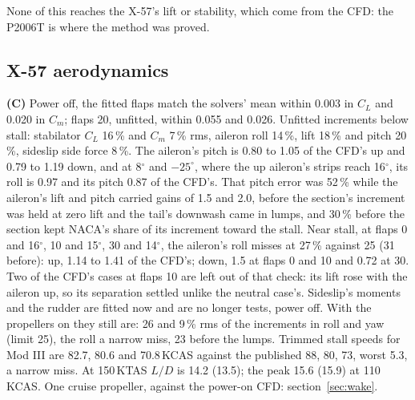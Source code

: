 \documentclass[10pt,a4paper,twocolumn]{article}
\begin{document}
None of this reaches the X-57's lift or stability, which come from the CFD: the P2006T is where the method was proved.

\subsection{X-57 aerodynamics}
\textbf{(C)} Power off, the fitted flaps match the solvers' mean within 0.003 in $C_L$ and 0.020 in $C_m$; flaps 20, unfitted, within 0.055 and 0.026. Unfitted increments below stall: stabilator $C_L$ 16\,\% and $C_m$ 7\,\% rms, aileron roll 14\,\%, lift 18\,\% and pitch 20\,\%, sideslip side force 8\,\%. The aileron's pitch is 0.80 to 1.05 of the CFD's up and 0.79 to 1.19 down, and at 8$^\circ$ and $-25^\circ$, where the up aileron's strips reach 16$^\circ$, its roll is 0.97 and its pitch 0.87 of the CFD's. That pitch error was 52\,\% while the aileron's lift and pitch carried gains of 1.5 and 2.0, before the section's increment was held at zero lift and the tail's downwash came in lumps, and 30\,\% before the section kept NACA's share of its increment toward the stall. Near stall, at flaps 0 and 16$^\circ$, 10 and 15$^\circ$, 30 and 14$^\circ$, the aileron's roll misses at 27\,\% against 25 (31 before): up, 1.14 to 1.41 of the CFD's; down, 1.5 at flaps 0 and 10 and 0.72 at 30. Two of the CFD's cases at flaps 10 are left out of that check: its lift rose with the aileron up, so its separation settled unlike the neutral case's. Sideslip's moments and the rudder are fitted now and are no longer tests, power off. With the propellers on they still are: 26 and 9\,\% rms of the increments in roll and yaw (limit 25), the roll a narrow miss, 23 before the lumps. Trimmed stall speeds for Mod III are 82.7, 80.6 and 70.8\,KCAS against the published 88, 80, 73, worst 5.3, a narrow miss.
At 150\,KTAS $L/D$ is 14.2 (13.5); the peak 15.6 (15.9) at 110\,KCAS. One cruise propeller, against the power-on CFD: section~\ref{sec:wake}.
\end{document}
